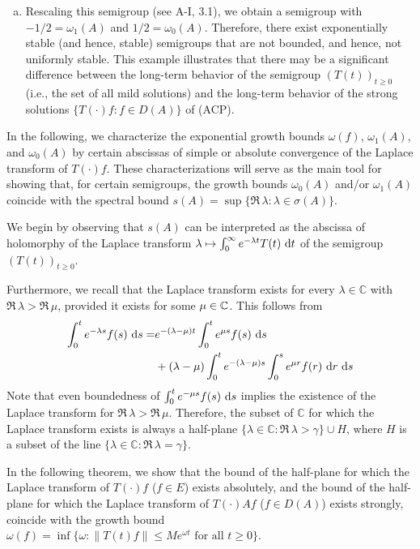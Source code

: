 \begin{example}
\begin{enumerate}[(a), wide]
\item
Rescaling this semigroup (see A-I, 3.1), we obtain a semigroup with $-1/2 = \omega_{1}(A)$ and $1/2 = \omega_0(A)$.
Therefore, there exist exponentially stable (and hence, stable) semigroups that are not bounded, and hence, not uniformly stable.
This example illustrates that there may be a significant difference between the long-term behavior of the semigroup $(T(t))_{t \geq 0}$ (i.e., the set of all mild solutions) and the long-term behavior of the strong solutions $\{T(\cdot)f : f \in D(A)\}$ of (ACP). 
\end{enumerate}
\end{example}

In the following, we characterize the exponential growth bounds $\omega(f)$, $\omega_{1}(A)$, and $\omega_0(A)$ by certain abscissas of simple or absolute convergence of the Laplace transform of $T(\cdot)f$. 
These characterizations will serve as the main tool for showing that, for certain semigroups, the growth bounds $\omega_0(A)$ and/or $\omega_{1}(A)$ coincide with the spectral bound $s(A) = \sup\{\Re\,\lambda : \lambda \in \sigma(A)\}$.

We begin by observing that $s(A)$ can be interpreted as the abscissa of holomorphy of the Laplace transform $\lambda \mapsto \int_{0}^{\infty} e^{-\lambda t} T(t) \,\mathop{}\!\mathrm{d}{t}$ of the semigroup $(T(t))_{t \geq 0}$.

Furthermore, we recall that the Laplace transform exists for every $\lambda \in \mathbb{C}$ with $\Re\,\lambda > \Re\,\mu$, provided it exists for some $\mu\in\mathbb{C}$.
This follows from 
\begin{align}\label{eq:a4-1.1}
\int_0^t e^{-\lambda s} f(s)\,\mathop{}\!\mathrm{d}{s} = &e^{-(\lambda-\mu)t} \int_{0}^{t} e^{\mu s} f(s) \,\mathop{}\!\mathrm{d}{s} \\ &+ (\lambda - \mu) \int_{0}^{t} e^{-(\lambda-\mu)s} \int_{0}^{s} e^{\mu r} f(r) \,\mathop{}\!\mathrm{d}{r}\,\mathop{}\!\mathrm{d}{s} \notag
\end{align}
Note that even boundedness of $\int_{0}^{t} e^{-\mu s}f(s) \,\mathop{}\!\mathrm{d}{s}$ implies the existence of the Laplace transform for $\Re\,\lambda > \Re\,\mu$. 
Therefore, the subset of $\mathbb{C}$ for which the Laplace transform exists is always a half-plane 
$\{\lambda \in \mathbb{C} : \Re\,\lambda > \gamma\} \cup H$, where $H$ is a subset of the line $\{\lambda \in \mathbb{C} : \Re\,\lambda = \gamma\}$.

In the following theorem, we show that the bound of the half-plane for which the Laplace transform of $T(\cdot)f$ ($f \in E$) exists absolutely, and the bound of the half-plane for which the Laplace transform of $T(\cdot)Af$ ($f \in D(A)$) exists strongly, coincide with the growth bound $\omega(f) = \inf\{\omega : \|T(t)f\| \leq Me^{\omega t} \text{ for all } t \geq 0\}$.

